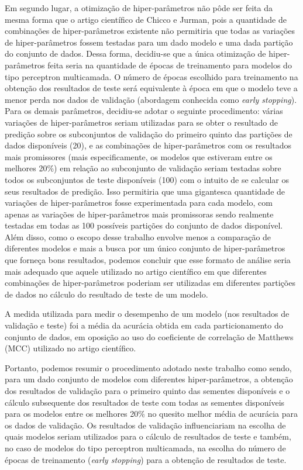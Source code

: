 Em segundo lugar, a otimização de hiper-parâmetros não pôde ser feita da mesma forma que o artigo científico de Chicco e Jurman, pois a quantidade de combinações de hiper-parâmetros existente não permitiria que todas as variações de hiper-parâmetros fossem testadas para um dado modelo e uma dada partição do conjunto de dados. Dessa forma, decidiu-se que a única otimização de hiper-parâmetros feita seria na quantidade de épocas de treinamento para modelos do tipo perceptron multicamada. O número de épocas escolhido para treinamento na obtenção dos resultados de teste será equivalente à época em que o modelo teve a menor perda nos dados de validação (abordagem conhecida como \textit{early stopping}). Para os demais parâmetros, decidiu-se adotar o seguinte procedimento: várias variações de hiper-parâmetros seriam utilizadas para se obter o resultado de predição sobre os subconjuntos de validação do primeiro quinto das partições de dados disponíveis (20), e as combinações de hiper-parâmetros com os resultados mais promissores (mais especificamente, os modelos que estiveram entre os melhores 20\%) em relação ao subconjunto de validação seriam testadas sobre todos os subconjuntos de teste disponíveis (100) com o intuito de se calcular os seus resultados de predição. Isso permitiria que uma gigantesca quantidade de variações de hiper-parâmetros fosse experimentada para cada modelo, com apenas as variações de hiper-parâmetros mais promissoras sendo realmente testadas em todas as 100 possíveis partições do conjunto de dados disponível. Além disso, como o escopo desse trabalho envolve menos a comparação de diferentes modelos e mais a busca por um único conjunto de hiper-parâmetros que forneça bons resultados, podemos concluir que esse formato de análise seria mais adequado que aquele utilizado no artigo científico em que diferentes combinações de hiper-parâmetros poderiam ser utilizadas em diferentes partições de dados no cálculo do resultado de teste de um modelo.

A medida utilizada para medir o desempenho de um modelo (nos resultados de validação e teste) foi a média da acurácia obtida em cada particionamento do conjunto de dados, em oposição ao uso do coeficiente de correlação de Matthews (MCC) utilizado no artigo científico.

Portanto, podemos resumir o procedimento adotado neste trabalho como sendo, para um dado conjunto de modelos com diferentes hiper-parâmetros, a obtenção dos resultados de validação para o primeiro quinto das sementes disponíveis e o cálculo subsequente dos resultados de teste com todas as sementes disponíveis para os modelos entre os melhores 20\% no quesito melhor média de acurácia para os dados de validação. Os resultados de validação influenciariam na escolha de quais modelos seriam utilizados para o cálculo de resultados de teste e também, no caso de modelos do tipo perceptron multicamada, na escolha do número de épocas de treinamento (\textit{early stopping}) para a obtenção de resultados de teste.

